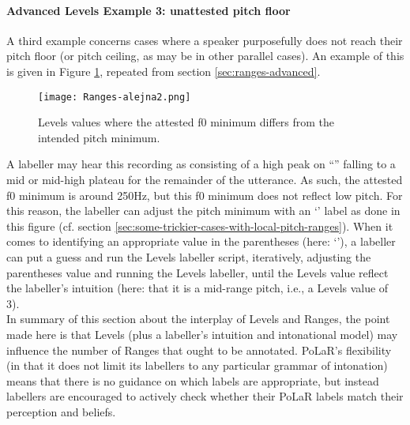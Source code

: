 \paragraph{Advanced Levels Example 3: unattested pitch floor}
A third example concerns cases where a speaker purposefully does not reach their pitch floor (or pitch ceiling, as may be in other parallel cases). An example of this is given in Figure \ref{fig:alejna2 na Levels}, repeated from section \ref{sec:ranges-advanced}.

\begin{figure}[H]
\centering
%
\texttt{[image: Ranges-alejna2.png]}
%
\caption{Levels values where the attested f0 minimum differs from the intended pitch minimum.%
\label{fig:alejna2 na Levels}%
}
\end{figure}

A labeller may hear this recording as consisting of a high peak on “” falling to a mid or mid-high plateau for the remainder of the utterance. As such, the attested f0 minimum is around 250Hz, but this f0 minimum does not reflect low pitch. For this reason, the labeller can adjust the pitch minimum with an ‘’ label as done in this figure (cf. section \ref{sec:some-trickier-cases-with-local-pitch-ranges}). When it comes to identifying an appropriate value in the parentheses (here: ‘’), a labeller can put a guess and run the Levels labeller script, iteratively, adjusting the parentheses value and running the Levels labeller, until the Levels value reflect the labeller’s intuition (here: that it is a mid-range pitch, i.e., a Levels value of 3).\\

In summary of this section about the interplay of Levels and Ranges, the point made here is that Levels (plus a labeller’s intuition and intonational model) may influence the number of Ranges that ought to be annotated. PoLaR’s flexibility (in that it does not limit its labellers to any particular grammar of intonation) means that there is no guidance on which labels are appropriate, but instead labellers are encouraged to actively check whether their PoLaR labels match their perception and beliefs.


